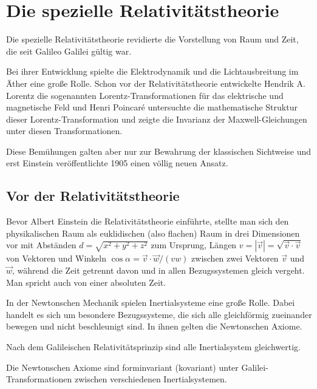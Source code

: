

\chapter{Die spezielle Relativitätstheorie}

Die spezielle Relativitätstheorie revidierte die Vorstellung von Raum und Zeit, die seit Galileo Galilei gültig war.

Bei ihrer Entwicklung spielte die Elektrodynamik und die Lichtausbreitung im Äther eine große Rolle.
Schon vor der Relativitätstheorie entwickelte Hendrik A. Lorentz die sogenannten Lorentz-Transformationen für das elektrische und magnetische Feld und Henri Poincaré untersuchte die mathematische Struktur dieser Lorentz-Transformation und zeigte die Invarianz der Maxwell-Gleichungen unter diesen Transformationen.

Diese Bemühungen galten aber nur zur Bewahrung der klassischen Sichtweise und erst Einstein veröffentlichte 1905 einen völlig neuen Ansatz.

\section{Vor der Relativitätstheorie}

Bevor Albert Einstein die Relativitätstheorie einführte, stellte man sich den physikalischen Raum als euklidischen (also flachen) Raum in drei Dimensionen vor mit Abständen $d=\sqrt{x^2+y^2+z^2}$ zum Ursprung, Längen $v=\left|\vec v\right|=\sqrt{\vec v\cdot \vec v}$ von Vektoren und Winkeln $\cos\alpha=\vec v\cdot \vec w/(vw)$ zwischen zwei Vektoren $\vec v$ und $\vec w$, während die Zeit getrennt davon und in allen Bezugssystemen gleich vergeht.
Man spricht auch von einer absoluten Zeit.

In der Newtonschen Mechanik spielen Inertialsysteme eine große Rolle.
Dabei handelt es sich um besondere Bezugssysteme, die sich alle gleichförmig zueinander bewegen und nicht beschleunigt sind.
In ihnen gelten die Newtonschen Axiome.

Nach dem Galileischen Relativitätsprinzip sind alle Inertialsystem gleichwertig.

\begin{formal}
    Die Newtonschen Axiome sind forminvariant (kovariant) unter Galilei-Transformationen zwischen verschiedenen Inertialsystemen.
\end{formal}



